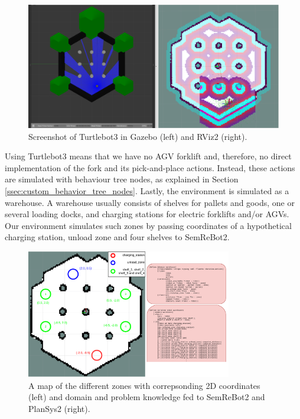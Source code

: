 \begin{figure}[ht]
    \centering
    \includegraphics[width=\textwidth]{figures/screenshot_sim_world.png}
    \caption[Simulation environment]{Screenshot of Turtlebot3 in Gazebo (left) and RViz2 (right).}
    \label{fig:screenshot_simworld}
\end{figure}

Using Turtlebot3 means that we have no AGV forklift and, therefore, no direct implementation of the fork and its pick-and-place actions. Instead, these actions are simulated with behaviour tree nodes, as explained in Section \ref{ssec:custom_behavior_tree_nodes}. Lastly, the environment is simulated as a warehouse. A warehouse usually consists of shelves for pallets and goods, one or several loading docks, and charging stations for electric forklifts and/or AGVs. Our environment simulates such zones by passing coordinates of a hypothetical charging station, unload zone and four shelves to SemReBot2. 

\begin{figure}
    \centering
    \includegraphics[width=0.8\textwidth]{figures/combined_domain.pdf}
    \caption[Simulated world knowledge]{A map of the different zones with correpsonding 2D coordinates (left) and domain and problem knowledge fed to SemReBot2 and PlanSys2 (right).}
    \label{fig:sim_world_knowledge}
\end{figure}

